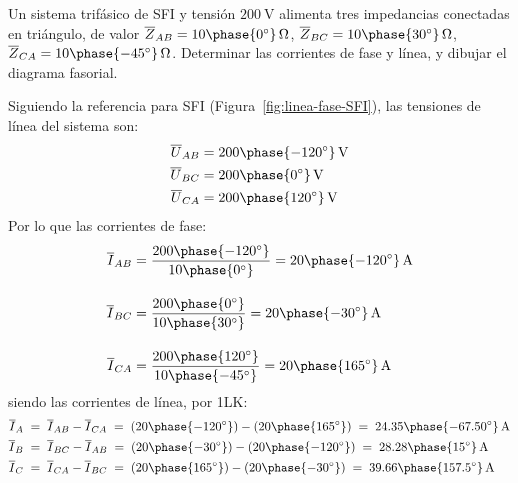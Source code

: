 	\vspace{4mm}
	\begin{example}\label{ej.3-3}
          Un sistema trifásico de SFI y tensión $\qty{200}{\volt}$
          alimenta tres impedancias conectadas en triángulo, de valor
          $\overline{Z}_{AB}=10\phase{0^\circ}\,\Omega$,
          $\overline{Z}_{BC}=10\phase{30^\circ}\,\Omega$,
          $\overline{Z}_{CA}=10\phase{-45^\circ}\,\Omega$. Determinar
          las corrientes de fase y línea, y dibujar el diagrama
          fasorial.

          \vspace{1mm} \hspace*{-5mm}\hrulefill
        
          \vspace{4mm}
	    
          Siguiendo la referencia para SFI
          (Figura~\ref{fig:linea-fase-SFI}), las tensiones de línea
          del sistema son:
          \begin{align*}
            \overline{U}_{AB}&=200\phase{-120^\circ}\,\si{\volt}\\
            \overline{U}_{BC}&=200\phase{0^\circ}\,\si{\volt}\\
            \overline{U}_{CA}&=200\phase{120^\circ}\,\si{\volt}
          \end{align*}
          Por lo que las corrientes de fase:
          \begin{align*}
            \overline{I}_{AB} &= \frac{200\phase{-120^\circ}}{10\phase{0^\circ}} =20\phase{-120^\circ}\,\si{\ampere} \\[10pt]
            \overline{I}_{BC} &= \frac{200\phase{0^\circ}}{10\phase{30^\circ}} = 20\phase{-30^\circ}\,\si{\ampere}\\[10pt]
            \overline{I}_{CA} &=\frac{200\phase{120^\circ}}{10\phase{-45^\circ}} = 20\phase{165^\circ}\,\si{\ampere}
          \end{align*}
          siendo las corrientes de línea, por 1LK:
          \begin{align*}
            \overline{I}_A \; &= \; \overline{I}_{AB} - \overline{I}_{CA} \;=\; (20\phase{-120^\circ})-(20\phase{165^\circ}) \;=\; 24.35\phase{-67.50^\circ}\,\si{\ampere}\\	        
            \overline{I}_B \; &= \; \overline{I}_{BC} - \overline{I}_{AB} \;=\; (20\phase{-30^\circ})-(20\phase{-120^\circ}) \;=\; 28.28\phase{15^\circ}\,\si{\ampere}\\
            \overline{I}_C \; &= \; \overline{I}_{CA} - \overline{I}_{BC} \;=\; (20\phase{165^\circ})-(20\phase{-30^\circ}) \;=\; 39.66\phase{157.5^\circ}\,\si{\ampere}

\end{align*}
\end{example}
